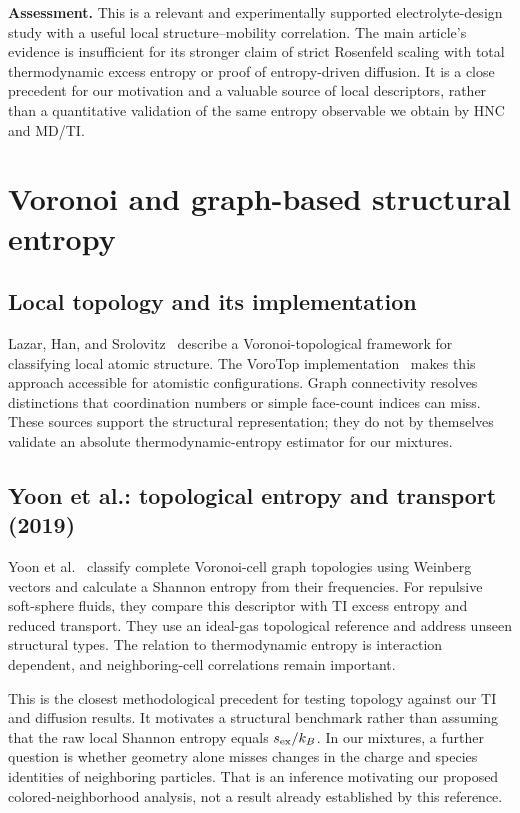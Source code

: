 \documentclass[11pt,a4paper]{article}
\begin{document}
\noindent\textbf{Assessment.} This is a relevant and experimentally supported
electrolyte-design study with a useful local structure--mobility correlation.
The main article's evidence is insufficient for its stronger claim of strict
Rosenfeld scaling with total thermodynamic excess entropy or proof of
entropy-driven diffusion. It is a close precedent for our motivation and a
valuable source of local descriptors, rather than a quantitative validation
of the same entropy observable we obtain by HNC and MD/TI.

\section{Voronoi and graph-based structural entropy}
\subsection{Local topology and its implementation}
Lazar, Han, and Srolovitz~\cite{Lazar2015} describe a Voronoi-topological
framework for classifying local atomic structure. The VoroTop
implementation~\cite{LazarToolkit} makes this approach accessible for
atomistic configurations. Graph connectivity resolves distinctions that
coordination numbers or simple face-count indices can miss. These sources
support the structural representation; they do not by themselves validate
an absolute thermodynamic-entropy estimator for our mixtures.

\subsection{Yoon et al.: topological entropy and transport (2019)}
Yoon et al.~\cite{Yoon2019} classify complete Voronoi-cell graph topologies
using Weinberg vectors and calculate a Shannon entropy from their frequencies.
For repulsive soft-sphere fluids, they compare this descriptor with TI excess
entropy and reduced transport. They use an ideal-gas topological reference
and address unseen structural types. The relation to thermodynamic entropy
is interaction dependent, and neighboring-cell correlations remain important.

This is the closest methodological precedent for testing topology against
our TI and diffusion results. It motivates a structural benchmark rather
than assuming that the raw local Shannon entropy equals $s_{\rm ex}/k_B$.
In our mixtures, a further question is whether geometry alone misses changes
in the charge and species identities of neighboring particles. That is an
inference motivating our proposed colored-neighborhood analysis, not a
result already established by this reference.
\end{document}
